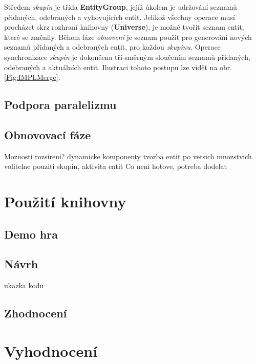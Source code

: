Středem \emph{skupin} je třída \textbf{EntityGroup}, jejíž úkolem je udržování seznamů přidaných, odebraných a vyhovujících entit. Jelikož všechny operace musí procházet skrz rozhraní knihovny (\textbf{Universe}), je možné tvořit seznam entit, které se změnily. Během fáze \emph{obnovení} je seznam použit pro generování nových seznamů přidaných a odebraných entit, pro každou \emph{skupinu}. Operace synchronizace \emph{skupin} je dokončena tří-směrným sloučením seznamů přidaných, odebraných a aktuálních entit. Ilustraci tohoto postupu lze vidět na obr. \ref{Fig:IMPLMerge}.

\section{Podpora paralelizmu}
\blind[3]

\section{Obnovovací fáze}
\blind[2]

Moznosti rozsireni? 
dynamicke komponenty
tvorba entit po vetsich mnozstvich
volitelne pouziti skupin, aktivita entit
Co neni hotove, potreba dodelat

\chapter{Použití knihovny}

\section{Demo hra}
\blind[1]

\section{Návrh}
\blind[3]

ukazka kodu

\section{Zhodnocení}
\blind[3]


\chapter{Vyhodnocení}
\label{Chap:Results}
\blind[1]

